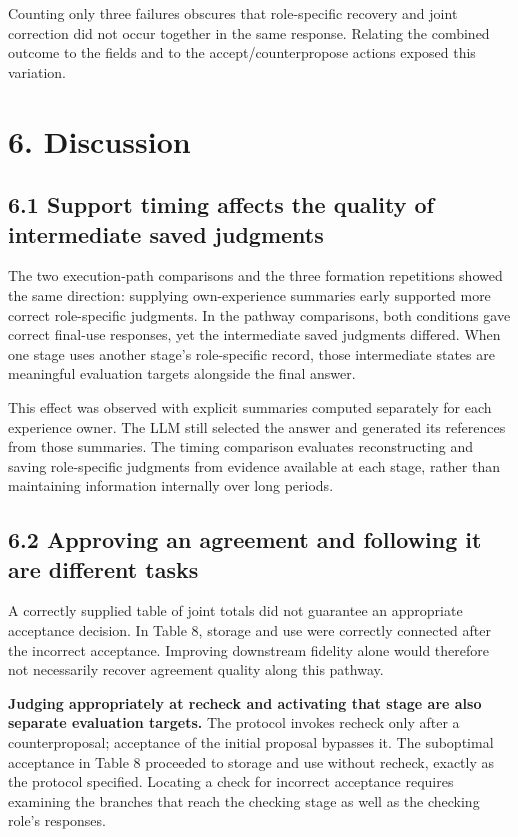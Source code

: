 \documentclass[10pt,a4paper]{article}
\begin{document}
Counting only three failures obscures that role-specific recovery and joint correction did not occur together in the same response. Relating the combined outcome to the fields and to the accept/counterpropose actions exposed this variation.

\section{6. Discussion}\label{paper-03-discussion}

\subsection{6.1 Support timing affects the quality of intermediate saved judgments}\label{paper-03-support-timing-affects-the-quality-of-intermediate-saved-judgments}

The two execution-path comparisons and the three formation repetitions showed the same direction: supplying own-experience summaries early supported more correct role-specific judgments. In the pathway comparisons, both conditions gave correct final-use responses, yet the intermediate saved judgments differed. When one stage uses another stage's role-specific record, those intermediate states are meaningful evaluation targets alongside the final answer.

This effect was observed with explicit summaries computed separately for each experience owner. The LLM still selected the answer and generated its references from those summaries. The timing comparison evaluates reconstructing and saving role-specific judgments from evidence available at each stage, rather than maintaining information internally over long periods.

\subsection{6.2 Approving an agreement and following it are different tasks}\label{paper-03-approving-an-agreement-and-following-it-are-different-tasks}

A correctly supplied table of joint totals did not guarantee an appropriate acceptance decision. In Table 8, storage and use were correctly connected after the incorrect acceptance. Improving downstream fidelity alone would therefore not necessarily recover agreement quality along this pathway.

\textbf{Judging appropriately at recheck and activating that stage are also separate evaluation targets.} The protocol invokes recheck only after a counterproposal; acceptance of the initial proposal bypasses it. The suboptimal acceptance in Table 8 proceeded to storage and use without recheck, exactly as the protocol specified. Locating a check for incorrect acceptance requires examining the branches that reach the checking stage as well as the checking role's responses.
\end{document}
